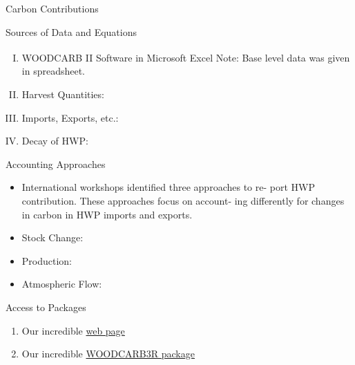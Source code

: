 \documentclass[final]{beamer}\usepackage[]{graphicx}\usepackage[]{color}
\begin{document}
\begin{frame}[fragile]
\begin{columns}[t]
\begin{column}{0.23\linewidth}
\begin{minipage}[t][.955\textheight]{\linewidth}
\begin{block}{Carbon Contributions}
\begin{itemize}
\end{itemize}
\vspace{0ex}
\vfill
\end{block}
\vfill

\begin{block}{Sources of Data and Equations}

\begin{enumerate}[I.]
\item WOODCARB II Software in Microsoft Excel\textsuperscript{\textregistered}
\vspace{0ex}
Note: Base level data was given in spreadsheet. 
\item Harvest Quantities:
\item Imports, Exports, etc.:
\item Decay of HWP:
\end{enumerate}
\vspace{0ex}

\end{block}
\vfill


\begin{block}{Accounting Approaches}

\begin{itemize}
\item International workshops identified three approaches to re- port HWP contribution. These approaches focus on account- ing differently for changes in carbon in HWP imports and exports.
\item Stock Change:
\item Production:
\item Atmospheric Flow:
\end{itemize}


\end{block}
\vfill


\begin{block}{Access to Packages}

\begin{enumerate}
\item Our incredible \href{http://madeitup.com}{web page}
\item Our incredible \href{http://benjones2.github.io/WOODCARB3R/}{WOODCARB3R package}
\end{enumerate}


\end{block}
\vfill

\end{minipage}
\end{column}%


\end{columns}
\end{frame}
\end{document}
